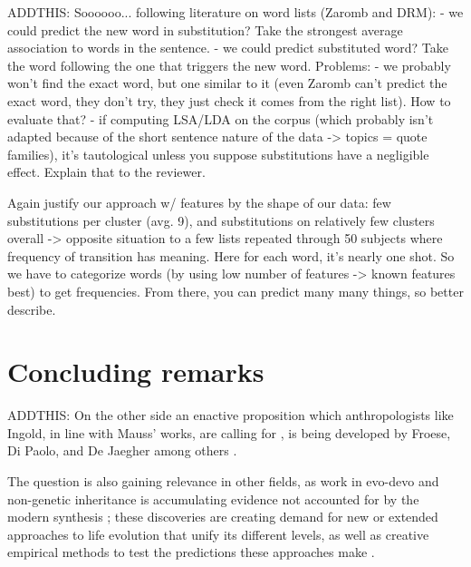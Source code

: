 \begin{new}
ADDTHIS:
Soooooo... following literature on word lists (Zaromb and DRM):
- we could predict the new word in substitution? Take the strongest average association to words in the sentence.
- we could predict substituted word? Take the word following the one that triggers the new word.
Problems:
- we probably won't find the exact word, but one similar to it (even Zaromb can't predict the exact word, they don't try, they just check it comes from the right list). How to evaluate that?
- if computing LSA/LDA on the corpus (which probably isn't adapted because of the short sentence nature of the data -> topics = quote families), it's tautological unless you suppose substitutions have a negligible effect.
Explain that to the reviewer.

Again justify our approach w/ features by the shape of our data: few substitutions per cluster (avg. 9), and substitutions on relatively few clusters overall -> opposite situation to a few lists repeated through 50 subjects where frequency of transition has meaning. Here for each word, it's nearly one shot. So we have to categorize words (by using low number of features -> known features best) to get frequencies. From there, you can predict many many things, so better describe.


\end{new}

\section{Concluding remarks}\label{sec:conclusion}


\begin{new}


ADDTHIS:
On the other side an enactive proposition which anthropologists like Ingold, in line with Mauss' works, are calling for \CN, is being developed by Froese, Di Paolo, and De Jaegher among others \CNs.

The question is also gaining relevance in other fields, as work in evo-devo and non-genetic inheritance is accumulating evidence not accounted for by the modern synthesis \CN;
these discoveries are creating demand for new or extended approaches to life evolution that unify its different levels, as well as creative empirical methods to test the predictions these approaches make \CN.

\end{new}

